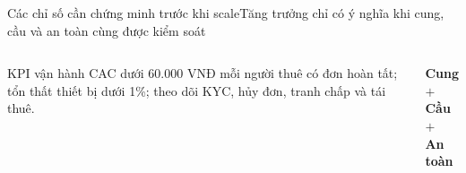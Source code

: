 \begin{frame}{Các chỉ số cần chứng minh trước khi scale}{Tăng trưởng chỉ có ý nghĩa khi cung, cầu và an toàn cùng được kiểm soát}
  \begin{columns}[T,onlytextwidth]
      \begin{block}{KPI vận hành}
        CAC dưới 60.000 VNĐ mỗi người thuê có đơn hoàn tất; tổn thất thiết bị dưới 1\%; theo dõi KYC, hủy đơn, tranh chấp và tái thuê.
      \end{block}
      \begin{cookiecard}[title=Điều kiện scale]
        \centering\Large\textcolor{mutuxBlue}{\textbf{Cung}}\\[-.1em]
        $+$\\[-.1em]\textcolor{mutuxBlue}{\textbf{Cầu}}\\[-.1em]
        $+$\\[-.1em]\textcolor{mutuxBlue}{\textbf{An toàn}}
      \end{cookiecard}
  \end{columns}
\end{frame}
